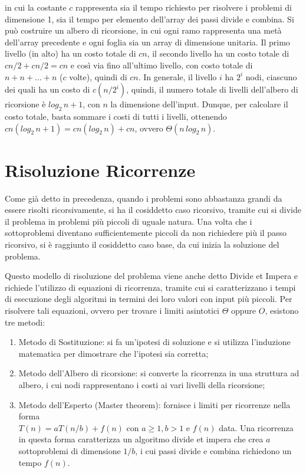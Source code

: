 in cui la costante \(c\) rappresenta sia il tempo richiesto per risolvere i problemi di dimensione 1, sia il tempo per elemento dell'array dei passi divide e combina. Si può costruire un albero di ricorsione, in cui ogni ramo rappresenta una metà dell'array precedente e ogni foglia sia un array di dimensione unitaria. Il primo livello (in alto) ha un costo totale di \(cn\), il secondo livello ha un costo totale di \(cn/2 + cn/2 = cn\) e così via fino all'ultimo livello, con costo totale di \(n + n +...+ n\) (\(c\) volte), quindi di \(cn\). In generale, il livello \(i\) ha \(2^i\) nodi, ciascuno dei quali ha un costo di \(c(n/2^i)\), quindi, il numero totale di livelli dell'albero di ricorsione è \(log_2\,n+1\), con \(n\) la dimensione dell'input. Dunque, per calcolare il costo totale, basta sommare i costi di tutti i livelli, ottenendo \(cn(log_2\,n+1) = cn(log_2\,n)+cn\), ovvero \(\Theta(n\,log_2\,n)\).

\section{Risoluzione Ricorrenze}
Come già detto in precedenza, quando i problemi sono abbastanza grandi da essere risolti ricorsivamente, si ha il cosiddetto caso ricorsivo, tramite cui si divide il problema in problemi più piccoli di uguale natura. Una volta che i sottoproblemi diventano sufficientemente piccoli da non richiedere più il passo ricorsivo, si è raggiunto il cosiddetto caso base, da cui inizia la soluzione del problema. 

Questo modello di risoluzione del problema viene anche detto Divide et Impera e richiede l'utilizzo di equazioni di ricorrenza, tramite cui si caratterizzano i tempi di esecuzione degli algoritmi in termini dei loro valori con input più piccoli. Per risolvere tali equazioni, ovvero per trovare i limiti asintotici \(\Theta\) oppure \(O\), esistono tre metodi:
\begin{enumerate}
  \item Metodo di Sostituzione: si fa un'ipotesi di soluzione e si utilizza l'induzione matematica per dimostrare che l'ipotesi sia corretta;
  \item Metodo dell'Albero di ricorsione: si converte la ricorrenza in una struttura ad albero, i cui nodi rappresentano i costi ai vari livelli della ricorsione;
  \item Metodo dell'Esperto (Master theorem): fornisce i limiti per ricorrenze nella forma \\ \(T(n)=aT(n/b)+f(n)\) con \(a\ge 1, b>1\) e \(f(n)\) data. Una ricorrenza in questa forma caratterizza un algoritmo divide et impera che crea \(a\) sottoproblemi di dimensione \(1/b\), i cui passi divide e combina richiedono un tempo \(f(n)\).
\end{enumerate}

